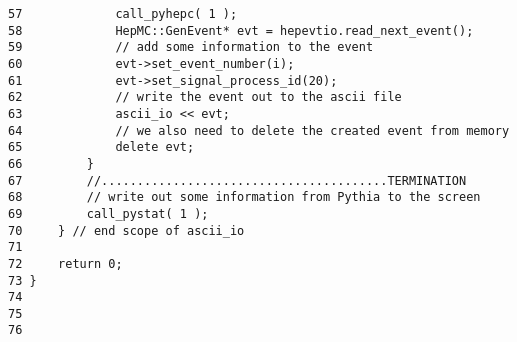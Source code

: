 \begin{DocInclude}
\begin{verbatim}
57             call_pyhepc( 1 );
58             HepMC::GenEvent* evt = hepevtio.read_next_event();
59             // add some information to the event
60             evt->set_event_number(i);
61             evt->set_signal_process_id(20);
62             // write the event out to the ascii file
63             ascii_io << evt;
64             // we also need to delete the created event from memory
65             delete evt;
66         }
67         //........................................TERMINATION
68         // write out some information from Pythia to the screen
69         call_pystat( 1 );    
70     } // end scope of ascii_io
71 
72     return 0;
73 }
74 
75 
76  
\end{verbatim}
\end{DocInclude}
 